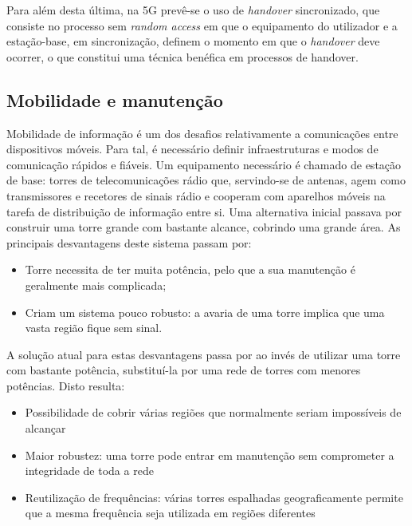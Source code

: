 \documentclass{llncs}
\begin{document}
Para além desta última, na 5G prevê-se o uso de \textit{handover} sincronizado, que consiste no processo sem \textit{random access} em que o equipamento do utilizador e a estação-base, em sincronização, definem o momento em que o \textit{handover} deve ocorrer, o que constitui uma técnica benéfica em processos de handover.

\subsection{Mobilidade e manutenção}
\hspace*{1.5em}Mobilidade de informação é um dos desafios relativamente a comunicações entre dispositivos móveis. Para tal, é necessário definir infraestruturas e modos de comunicação rápidos e fiáveis. Um equipamento necessário é chamado de estação de base: torres de telecomunicações rádio que, servindo-se de antenas, agem como transmissores e recetores de sinais rádio e cooperam com aparelhos móveis na tarefa de distribuição de informação entre si.
Uma alternativa inicial passava por construir uma torre grande com bastante alcance, cobrindo uma grande área. As principais desvantagens deste sistema passam por:
\begin{itemize}
    \item Torre necessita de ter muita potência, pelo que a sua manutenção é geralmente mais complicada;
    \item Criam um sistema pouco robusto: a avaria de uma torre implica que uma vasta região fique sem sinal.
\end{itemize}

\hspace*{1.5em}A solução atual para estas desvantagens passa por ao invés de utilizar uma torre com bastante potência, substituí-la por uma rede de torres com menores potências. Disto resulta:

\begin{itemize}
    \item Possibilidade de cobrir várias regiões que normalmente seriam impossíveis de alcançar
    \item Maior robustez: uma torre pode entrar em manutenção sem comprometer a integridade de toda a rede
    \item Reutilização de frequências: várias torres espalhadas geograficamente permite que a mesma frequência seja utilizada em regiões diferentes
\end{itemize}
\end{document}
